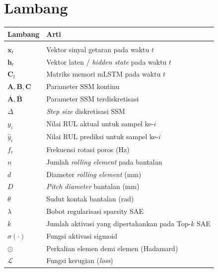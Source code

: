 \vspace{1cm}
\section*{Lambang}
\begin{singlespace}
\begin{tabular}{p{3cm}p{11cm}}
\textbf{Lambang} & \textbf{Arti} \\[2pt]
\hline\\[-6pt]
$\mathbf{x}_t$ & Vektor sinyal getaran pada waktu $t$ \\
$\mathbf{h}_t$ & Vektor laten / \emph{hidden state} pada waktu $t$ \\
$\mathbf{C}_t$ & Matriks memori mLSTM pada waktu $t$ \\
$\mathbf{A}, \mathbf{B}, \mathbf{C}$ & Parameter SSM kontinu \\
$\bar{\mathbf{A}}, \bar{\mathbf{B}}$ & Parameter SSM terdiskretisasi \\
$\Delta$       & \emph{Step size} diskretisasi SSM \\
$y_i$          & Nilai RUL aktual untuk sampel ke-$i$ \\
$\hat{y}_i$    & Nilai RUL prediksi untuk sampel ke-$i$ \\
$f_r$          & Frekuensi rotasi poros (Hz) \\
$n$            & Jumlah \emph{rolling element} pada bantalan \\
$d$            & Diameter \emph{rolling element} (mm) \\
$D$            & \emph{Pitch diameter} bantalan (mm) \\
$\theta$       & Sudut kontak bantalan (rad) \\
$\lambda$      & Bobot regularisasi sparsity SAE \\
$k$            & Jumlah aktivasi yang dipertahankan pada Top-$k$ SAE \\
$\sigma(\cdot)$ & Fungsi aktivasi sigmoid \\
$\odot$        & Perkalian elemen demi elemen (Hadamard) \\
$\mathcal{L}$  & Fungsi kerugian (\emph{loss}) \\
\end{tabular}
\end{singlespace}

\cleardoublepage
